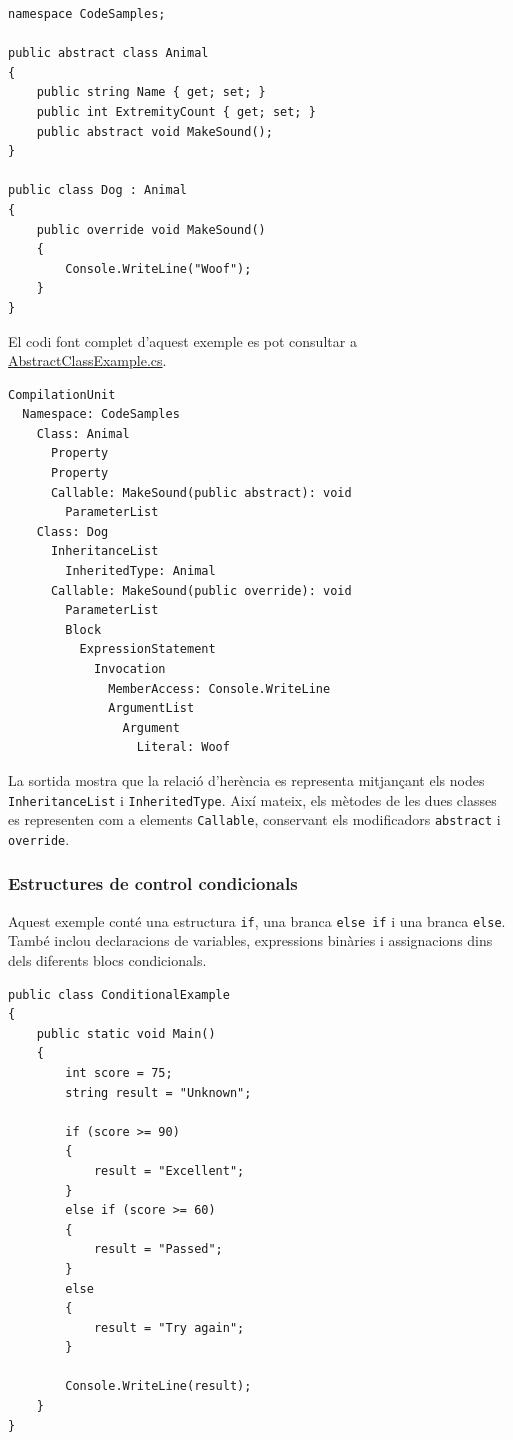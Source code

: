 \begin{lstlisting}[style=code,
    caption={Codi font de l'exemple d'herència i classes abstractes},
    label={lst:inheritance-source}]
namespace CodeSamples;

public abstract class Animal
{
    public string Name { get; set; }
    public int ExtremityCount { get; set; }
    public abstract void MakeSound();
}

public class Dog : Animal
{
    public override void MakeSound()
    {
        Console.WriteLine("Woof");
    }
}
\end{lstlisting}

El codi font complet d'aquest exemple es pot consultar
a \href{https://github.com/PauDiazM/static-code-analysis-tfg/blob/main/code_samples/examples/AbstractClassExample.cs}{AbstractClassExample.cs}.

\begin{lstlisting}[style=output,
    caption={Sortida resumida del mòdul Parser per a l'exemple d'herència},
    label={lst:inheritance-output}]
CompilationUnit
  Namespace: CodeSamples
    Class: Animal
      Property
      Property
      Callable: MakeSound(public abstract): void
        ParameterList
    Class: Dog
      InheritanceList
        InheritedType: Animal
      Callable: MakeSound(public override): void
        ParameterList
        Block
          ExpressionStatement
            Invocation
              MemberAccess: Console.WriteLine
              ArgumentList
                Argument
                  Literal: Woof
\end{lstlisting}

La sortida mostra que la relació d'herència es representa mitjançant els nodes
\texttt{InheritanceList} i \texttt{InheritedType}. Així mateix, els mètodes de
les dues classes es representen com a elements \texttt{Callable}, conservant els
modificadors \texttt{abstract} i \texttt{override}.

\subsubsection*{Estructures de control condicionals}
\label{sec:parser-conditionals}

Aquest exemple conté una estructura \texttt{if}, una branca \texttt{else if} i una
branca \texttt{else}. També inclou declaracions de variables, expressions binàries
i assignacions dins dels diferents blocs condicionals.

\begin{lstlisting}[style=code,
    caption={Codi font de l'exemple d'estructures condicionals},
    label={lst:conditional-source}]
public class ConditionalExample
{
    public static void Main()
    {
        int score = 75;
        string result = "Unknown";

        if (score >= 90)
        {
            result = "Excellent";
        }
        else if (score >= 60)
        {
            result = "Passed";
        }
        else
        {
            result = "Try again";
        }

        Console.WriteLine(result);
    }
}
\end{lstlisting}

